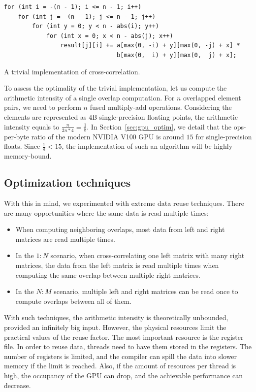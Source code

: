 \begin{listing}
\begin{verbatim}
for (int i = -(n - 1); i <= n - 1; i++)
    for (int j = -(n - 1); j <= n - 1; j++)
        for (int y = 0; y < n - abs(i); y++)
            for (int x = 0; x < n - abs(j); x++)
                result[j][i] += a[max(0, -i) + y][max(0, -j) + x] *
                                b[max(0,  i) + y][max(0,  j) + x];
\end{verbatim}
\caption{A trivial implementation of cross-correlation.}
\label{lst:cross}
\end{listing}

To assess the optimality of the trivial implementation, let us compute the arithmetic intensity of a single overlap computation. For $n$ overlapped element pairs, we need to perform $n$ fused multiply-add operations. Considering the elements are represented as $4$B single-precision floating points, the arithmetic intensity equals to $\frac{n}{2n * 4} = \frac{1}{8}$. In Section~\ref{sec:gpu_optim}, we detail that the ops-per-byte ratio of the modern NVIDIA V100 GPU is around $15$ for single-precision floats. Since $\frac{1}{8} < 15$, the implementation of such an algorithm will be highly memory-bound.

\subsection{Optimization techniques}

With this in mind, we experimented with extreme data reuse techniques. There are many opportunities where the same data is read multiple times:
\begin{itemize}
    \item When computing neighboring overlaps, most data from left and right matrices are read multiple times.
    \item In the $1:N$ scenario, when cross-correlating one left matrix with many right matrices, the data from the left matrix is read multiple times when computing the same overlap between multiple right matrices.
    \item In the $N:M$ scenario, multiple left and right matrices can be read once to compute overlaps between all of them.
\end{itemize}

With such techniques, the arithmetic intensity is theoretically unbounded, provided an infinitely big input. However, the physical resources limit the practical values of the reuse factor. The most important resource is the register file. In order to reuse data, threads need to have them stored in the registers. The number of registers is limited, and the compiler can spill the data into slower memory if the limit is reached. Also, if the amount of resources per thread is high, the occupancy of the GPU can drop, and the achievable performance can decrease.

